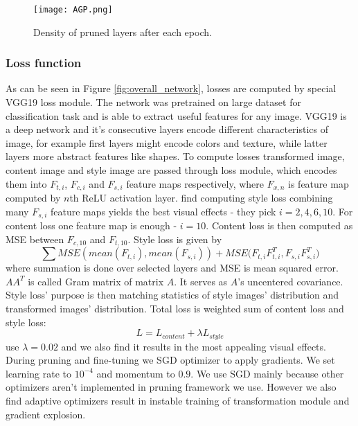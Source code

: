 \documentclass[../Main.tex]{subfiles}
\begin{document}
        \begin{figure}[h!]
            \texttt{[image: AGP.png]}
            \caption{Density of pruned layers after each epoch. 
            }
            \label{fig:AGP}
        \end{figure}
        

    
    \subsubsection{Loss function}
    As can be seen in Figure \ref{fig:overall_network}, losses are computed by
    special VGG19 loss module. The network was pretrained on large dataset for classification
    task and is able to extract useful features for any image. 
    VGG19 is a deep network and it's consecutive
    layers encode different characteristics of image, for example first layers might
    encode colors and texture, while latter layers more abstract features like shapes.
    To compute losses transformed image, content image and
    style image are passed through loss module, which encodes them into $F_{t,i}$, $F_{c,i}$ and 
    $F_{s,i}$ feature maps respectively, where $F_{x,n}$ is feature map computed by $n$th
    ReLU activation layer. \cite{Li2018} find computing style loss combining many $F_{s,i}$
    feature maps yields the best visual effects - they pick $i=2,4,6,10$. For 
    content loss one feature map is enough - $i=10$. Content loss is then computed as 
    MSE between $F_{c,10}$ and $F_{t,10}$. Style loss is given by 
    \[ \sum{MSE(mean(F_{t,i}), mean(F_{s,i})) + MSE(F_{t,i}F_{t,i}^T, F_{s,i}F_{s,i}^T}) \]
    where summation is done over selected layers and MSE is mean squared error.
    $AA^T$ is called Gram matrix of matrix $A$. It serves as $A$'s uncentered covariance.
    Style loss' purpose is then matching statistics of
    style images' distribution and transformed images' distribution.
    Total loss is weighted sum of content loss and style loss:
    \[L=L_{content} + \lambda L_{style}\] \cite{Li2018} use $\lambda=0.02$ and we 
    also find it results in the most appealing visual effects. During pruning and 
    fine-tuning we SGD optimizer to apply gradients. We set learning rate to $10^{-4}$
    and momentum to $0.9$. We use SGD mainly because other optimizers aren't implemented 
    in pruning framework we use. However we also find adaptive optimizers result 
    in instable training of transformation module and gradient explosion.
    
\end{document}
